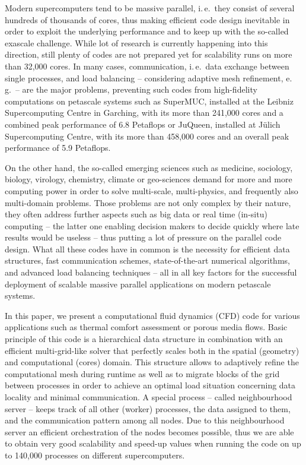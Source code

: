 \documentclass[10pt, conference, compsocconf]{IEEEtran}
\begin{document}
Modern supercomputers tend to be massive parallel, i.\,e.\ they consist of several hundreds of thousands of cores, thus making efficient code design inevitable in order to exploit the underlying performance and to keep up with the so-called exascale challenge. While lot of research is currently happening into this direction, still plenty of codes are not prepared yet for scalability runs on more than 32,000 cores. In many cases, communication, i.\,e.\ data exchange between single processes, and load balancing -- considering adaptive mesh refinement, e.\,g.\ -- are the major problems, preventing such codes from high-fidelity computations on petascale systems such as SuperMUC, installed at the Leibniz Supercomputing Centre in Garching, with its more than 241,000 cores and a combined peak performance of 6.8 Petaflops or JuQueen, installed at J\"ulich Supercomputing Centre, with its more than 458,000 cores and an overall peak performance of 5.9 Petaflops.

On the other hand, the so-called emerging sciences such as medicine, sociology, biology, virology, chemistry, climate or geo-sciences demand for more and more computing power in order to solve multi-scale, multi-physics, and frequently also multi-domain problems. Those problems are not only complex by their nature, they often address further aspects such as big data or real time (in-situ) computing -- the latter one enabling decision makers to decide quickly where late results would be useless -- thus putting a lot of pressure on the parallel code design. What all these codes have in common is the necessity for efficient data structures, fast communication schemes, state-of-the-art numerical algorithms, and advanced load balancing techniques -- all in all key factors for the successful deployment of scalable massive parallel applications on modern petascale systems.

In this paper, we present a computational fluid dynamics (CFD) code for various applications such as thermal comfort assessment or porous media flows. Basic principle of this code is a hierarchical data structure in combination with an efficient multi-grid-like solver that perfectly scales both in the spatial (geometry) and computational (cores) domain. This structure allows to adaptively refine the computational mesh during runtime as well as to migrate blocks of the grid between processes in order to achieve an optimal load situation concerning data locality and minimal communication. A special process -- called neighbourhood server -- keeps track of all other (worker) processes, the data assigned to them, and the communication pattern among all nodes. Due to this neighbourhood server an efficient orchestration of the nodes becomes possible, thus we are able to obtain very good scalability and speed-up values when running the code on up to 140,000 processes on different supercomputers.
\end{document}
